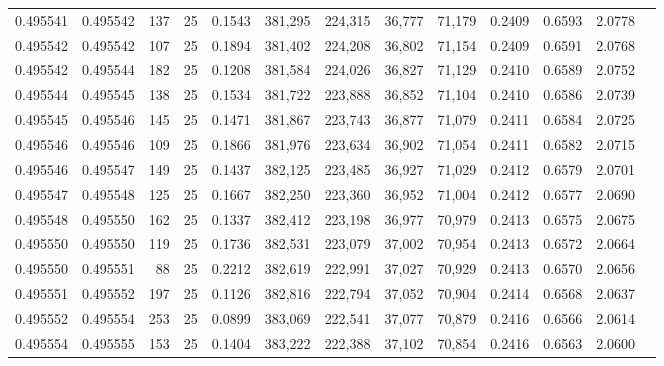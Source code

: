 \begin{tabular}{rrrrrrrrrrrrr}
0.495541 & 0.495542 &   137 &  25 &                                     0.1543 & 381,295 & 224,315 &  36,777 &  71,179 & 0.2409 & 0.6593 & 2.0778 \\
0.495542 & 0.495542 &   107 &  25 &                                     0.1894 & 381,402 & 224,208 &  36,802 &  71,154 & 0.2409 & 0.6591 & 2.0768 \\
0.495542 & 0.495544 &   182 &  25 &                                     0.1208 & 381,584 & 224,026 &  36,827 &  71,129 & 0.2410 & 0.6589 & 2.0752 \\
0.495544 & 0.495545 &   138 &  25 &                                     0.1534 & 381,722 & 223,888 &  36,852 &  71,104 & 0.2410 & 0.6586 & 2.0739 \\
0.495545 & 0.495546 &   145 &  25 &                                     0.1471 & 381,867 & 223,743 &  36,877 &  71,079 & 0.2411 & 0.6584 & 2.0725 \\
0.495546 & 0.495546 &   109 &  25 &                                     0.1866 & 381,976 & 223,634 &  36,902 &  71,054 & 0.2411 & 0.6582 & 2.0715 \\
0.495546 & 0.495547 &   149 &  25 &                                     0.1437 & 382,125 & 223,485 &  36,927 &  71,029 & 0.2412 & 0.6579 & 2.0701 \\
0.495547 & 0.495548 &   125 &  25 &                                     0.1667 & 382,250 & 223,360 &  36,952 &  71,004 & 0.2412 & 0.6577 & 2.0690 \\
0.495548 & 0.495550 &   162 &  25 &                                     0.1337 & 382,412 & 223,198 &  36,977 &  70,979 & 0.2413 & 0.6575 & 2.0675 \\
0.495550 & 0.495550 &   119 &  25 &                                     0.1736 & 382,531 & 223,079 &  37,002 &  70,954 & 0.2413 & 0.6572 & 2.0664 \\
0.495550 & 0.495551 &    88 &  25 &                                     0.2212 & 382,619 & 222,991 &  37,027 &  70,929 & 0.2413 & 0.6570 & 2.0656 \\
0.495551 & 0.495552 &   197 &  25 &                                     0.1126 & 382,816 & 222,794 &  37,052 &  70,904 & 0.2414 & 0.6568 & 2.0637 \\
0.495552 & 0.495554 &   253 &  25 &                                     0.0899 & 383,069 & 222,541 &  37,077 &  70,879 & 0.2416 & 0.6566 & 2.0614 \\
0.495554 & 0.495555 &   153 &  25 &                                     0.1404 & 383,222 & 222,388 &  37,102 &  70,854 & 0.2416 & 0.6563 & 2.0600 \\

\end{tabular}
